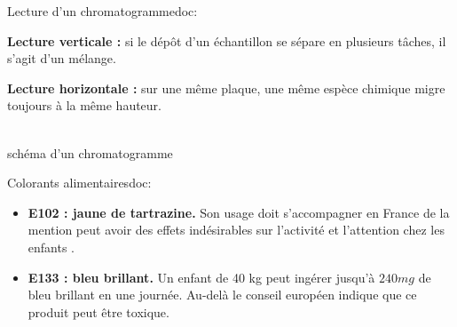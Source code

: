 \begin{doc}{Lecture d'un chromatogramme}{doc:}
  \begin{multicols}{2}
    \begin{listePoints}
      \item \textbf{Lecture verticale :} si le dépôt d'un échantillon se sépare en plusieurs tâches, il s'agit d'un mélange.
      \item \textbf{Lecture horizontale :} sur une même plaque, une même espèce chimique migre toujours à la même hauteur.
    \end{listePoints}
    \vfill \strut

    \centering
     \\
    \footnotesize{schéma d'un chromatogramme}
  \end{multicols}
\end{doc}

\begin{doc}{Colorants alimentaires}{doc:}
  \begin{itemize}[label=\textbullet]
    \item \textbf{E102 : jaune de tartrazine.} Son usage doit s'accompagner en France de la mention \og peut avoir des effets indésirables sur l'activité et l'attention chez les enfants \fg.
    \item \textbf{E133 : bleu brillant.} Un enfant de 40 kg peut ingérer jusqu'à $240\unit{mg}$ de bleu brillant en une journée. Au-delà le conseil européen indique que ce produit peut être toxique.
  \end{itemize}
\end{doc}

